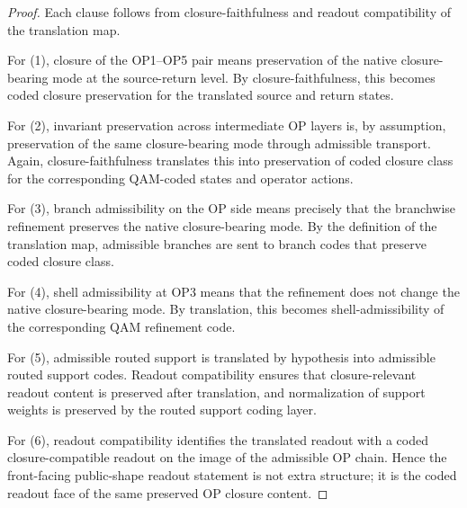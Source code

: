 \begin{proof}
Each clause follows from closure-faithfulness and readout compatibility of the translation map.

For (1), closure of the OP1--OP5 pair means preservation of the native closure-bearing mode at the source-return level. By closure-faithfulness, this becomes coded closure preservation for the translated source and return states.

For (2), invariant preservation across intermediate OP layers is, by assumption, preservation of the same closure-bearing mode through admissible transport. Again, closure-faithfulness translates this into preservation of coded closure class for the corresponding QAM-coded states and operator actions.

For (3), branch admissibility on the OP side means precisely that the branchwise refinement preserves the native closure-bearing mode. By the definition of the translation map, admissible branches are sent to branch codes that preserve coded closure class.

For (4), shell admissibility at OP3 means that the refinement does not change the native closure-bearing mode. By translation, this becomes shell-admissibility of the corresponding QAM refinement code.

For (5), admissible routed support is translated by hypothesis into admissible routed support codes. Readout compatibility ensures that closure-relevant readout content is preserved after translation, and normalization of support weights is preserved by the routed support coding layer.

For (6), readout compatibility identifies the translated readout with a coded closure-compatible readout on the image of the admissible OP chain. Hence the front-facing public-shape readout statement is not extra structure; it is the coded readout face of the same preserved OP closure content.
\end{proof}


